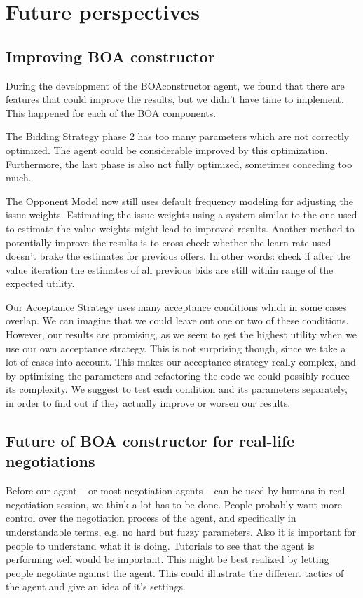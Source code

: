 \section{Future perspectives}
\label{sec:future}
\subsection{Improving BOA constructor}
During the development of the BOAconstructor agent, we found that there are features that could improve the results, but we didn't have time to implement. This happened for each of the BOA components.

The Bidding Strategy phase 2 has too many parameters which are not correctly optimized.
The agent could be considerable improved by this optimization. Furthermore, 
the last phase is also not fully optimized, sometimes conceding too much.

The Opponent Model now still uses default frequency modeling for adjusting the issue weights. Estimating the issue weights using a system similar to the one used to estimate the value weights might lead to improved results. Another method to potentially improve the results is to cross check whether the learn rate used doesn't brake the estimates for previous offers. In other words: check if after the value iteration the estimates of all previous bids are still within range of the expected utility. 

Our Acceptance Strategy uses many acceptance conditions which in some cases overlap. We can imagine that we could leave out one or two of these conditions. However, our results are promising, as we seem to get the highest utility when we use our own acceptance strategy. This is not surprising though, since we take a lot of cases into account. This makes our acceptance strategy really complex, and by optimizing the parameters and refactoring the code we could possibly reduce its complexity. We suggest to test each condition and its parameters separately, in order to find out if they actually improve or worsen our results.

\subsection{Future of BOA constructor for real-life negotiations}
Before our agent -- or most negotiation agents -- can be used by humans in real negotiation 
session, we think a lot has to be done. People probably want more control over the 
negotiation process of the agent, and specifically in understandable terms, e.g. no hard but fuzzy parameters.
Also it is important for people to understand what it is doing. 
Tutorials to see that the agent is performing well would be important. 
This might be best realized by letting people negotiate against the agent. 
This could illustrate the different tactics of the agent and give an idea of it's settings.

